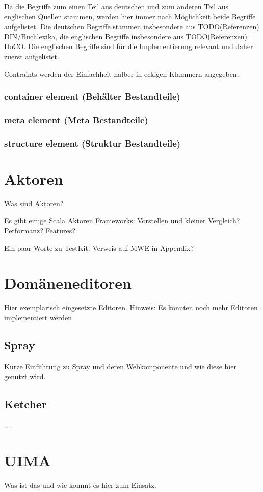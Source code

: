 Da die Begriffe zum einen Teil aus deutschen und zum anderen Teil aus englischen Quellen
stammen, werden hier immer nach Möglichkeit beide Begriffe aufgelistet.
Die deutschen Begriffe stammen insbesondere aus TODO(Referenzen) DIN/Buchlexika,
die englischen Begriffe insbesondere aus TODO(Referenzen) DoCO.
Die englischen Begriffe sind für die Implementierung relevant und daher zuerst aufgelistet.

Contraints werden der Einfachheit halber in eckigen Klammern angegeben.

\subsubsection{container element (Behälter Bestandteile)}



\subsubsection{meta element (Meta Bestandteile)}



\subsubsection{structure element (Struktur Bestandteile)}



\section{Aktoren}

Was sind Aktoren?

Es gibt einige Scala Aktoren Frameworks: Vorstellen und kleiner Vergleich?
Performanz? Features?

Ein paar Worte zu TestKit. Verweis auf MWE in Appendix?


\section{Domäneneditoren}

Hier exemplarisch eingesetzte Editoren. Hinweis: Es könnten noch mehr
Editoren implementiert werden

\subsection{Spray}

Kurze Einführung zu Spray und deren Webkomponente und wie diese hier genutzt
wird.

\subsection{Ketcher}

...


\section{UIMA}

Was ist das und wie kommt es hier zum Einsatz.
